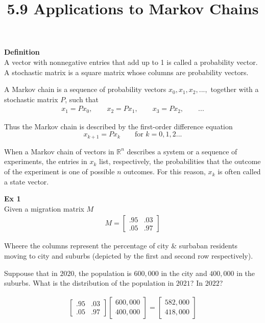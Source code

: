 \documentclass{article}
\title{5.9 Applications to Markov Chains}
\begin{document}
  \maketitle
  \textbf{Definition}\\
  A vector with nonnegative entries that add up to 1 is called a probability vector. A stochastic matrix is a square matrix whose columns are probability vectors.

  A Markov chain is a sequence of probability vectors $ x_0,x_1,x_2,..., $ together with a stochastic matrix $ P $, such that
  \[
    \begin{gathered}
    x_1=Px_0, \qquad x_2=Px_1, \qquad x_3=Px_2, \qquad ...
    \end{gathered}
  \]

  Thus the Markov chain is described by the first-order difference equation
  \[
    x_{k+1}=Px_k \qquad \text{for }k=0,1,2...
  \]

  When a Markov chain of vectors in $ \mathbb{R}^{n} $ describes a system or a sequence of experiments, the entries in $ x_k $ list, respectively, the probabilities that the outcome of the experiment is one of possible $ n $ outcomes. For this reason, $ x_k $ is often called a state vector.

  \textbf{Ex 1}\\
  Given a migration matrix $ M $ 
  \[
    \begin{gathered}
    M=\begin{bmatrix}
      .95 &.03\\
      .05 &.97
    \end{bmatrix}
    \end{gathered}
  \]

  Wheere the columns represent the percentage of city \& surbaban residents moving to city and suburbs (depicted by the first and second row respectively).

  Suppouse that in $ 2020 $, the population is $ 600,000 $ in the city and $ 400,000 $ in the suburbs. What is the distribution of the population in $ 2021 $? In $ 2022 $?

  \[
    \begin{gathered}
    \begin{bmatrix}
      .95 &.03\\
      .05 &.97
    \end{bmatrix}
    \begin{bmatrix}
      600,000\\
      400,000
    \end{bmatrix}=
    \begin{bmatrix}
      582,000\\
      418,000
    \end{bmatrix}
    \end{gathered}
  \]
\end{document}

